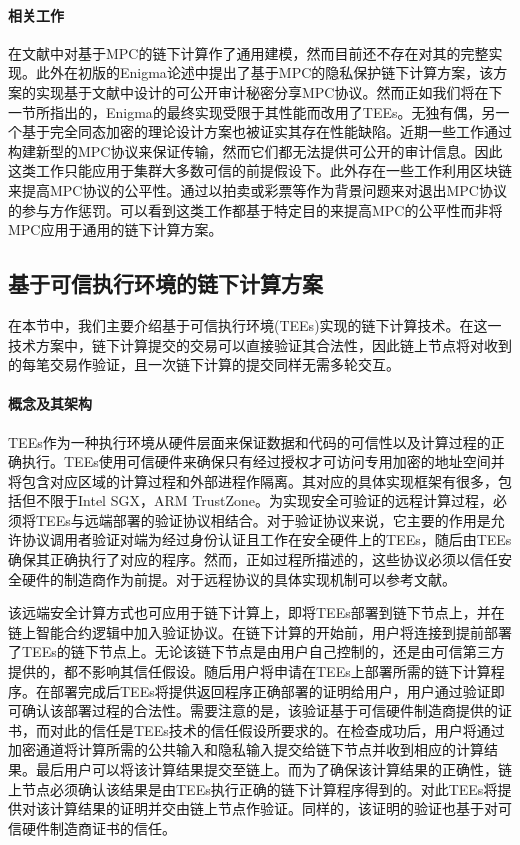 \paragraph{相关工作} 
在文献\cite{8726574}中对基于MPC的链下计算作了通用建模，然而目前还不存在对其的完整实现。此外在初版的Enigma\cite{2015arXiv150603471Z}论述中提出了基于MPC的隐私保护链下计算方案，该方案的实现基于文献\cite{cryptoeprint:2014/075}中设计的可公开审计秘密分享MPC协议。然而正如我们将在下一节所指出的，Enigma\cite{enigma2019}的最终实现受限于其性能而改用了TEEs。无独有偶，另一个基于完全同态加密的理论设计方案\cite{10.5555/1834954}也被证实其存在性能缺陷\cite{10.1145/2046660.2046682}。近期一些工作\cite{cryptoeprint:2019/883, 10.1145/3372297.3417261}通过构建新型的MPC协议来保证传输，然而它们都无法提供可公开的审计信息。因此这类工作只能应用于集群大多数可信的前提假设下。此外存在一些工作利用区块链来提高MPC协议的公平性。通过以拍卖或彩票\cite{6956580, 2017arXiv170106726B}等作为背景问题来对退出MPC协议的参与方作惩罚。可以看到这类工作都基于特定目的来提高MPC的公平性而非将MPC应用于通用的链下计算方案。

\subsection{基于可信执行环境的链下计算方案}
在本节中，我们主要介绍基于可信执行环境(TEEs)实现的链下计算技术。在这一技术方案中，链下计算提交的交易可以直接验证其合法性，因此链上节点将对收到的每笔交易作验证，且一次链下计算的提交同样无需多轮交互。

\paragraph{概念及其架构} 
TEEs作为一种执行环境从硬件层面来保证数据和代码的可信性以及计算过程的正确执行\cite{10.1007/978-3-662-53887-6_7}。TEEs使用可信硬件来确保只有经过授权才可访问专用加密的地址空间并将包含对应区域的计算过程和外部进程作隔离。其对应的具体实现框架有很多，包括但不限于Intel SGX\cite{90}，ARM TrustZone\cite{Trustzone}。为实现安全可验证的远程计算过程，必须将TEEs与远端部署的验证协议相结合。对于验证协议来说，它主要的作用是允许协议调用者验证对端为经过身份认证且工作在安全硬件上的TEEs，随后由TEEs确保其正确执行了对应的程序。然而，正如过程所描述的，这些协议必须以信任安全硬件的制造商作为前提。对于远程协议的具体实现机制可以参考文献\cite{90}。

该远端安全计算方式也可应用于链下计算上，即将TEEs部署到链下节点上，并在链上智能合约逻辑中加入验证协议。在链下计算的开始前，用户将连接到提前部署了TEEs的链下节点上。无论该链下节点是由用户自己控制的，还是由可信第三方提供的，都不影响其信任假设。随后用户将申请在TEEs上部署所需的链下计算程序。在部署完成后TEEs将提供返回程序正确部署的证明给用户，用户通过验证即可确认该部署过程的合法性。需要注意的是，该验证基于可信硬件制造商提供的证书，而对此的信任是TEEs技术的信任假设所要求的。在检查成功后，用户将通过加密通道将计算所需的公共输入和隐私输入提交给链下节点并收到相应的计算结果。最后用户可以将该计算结果提交至链上。而为了确保该计算结果的正确性，链上节点必须确认该结果是由TEEs执行正确的链下计算程序得到的。对此TEEs将提供对该计算结果的证明并交由链上节点作验证。同样的，该证明的验证也基于对可信硬件制造商证书的信任。

